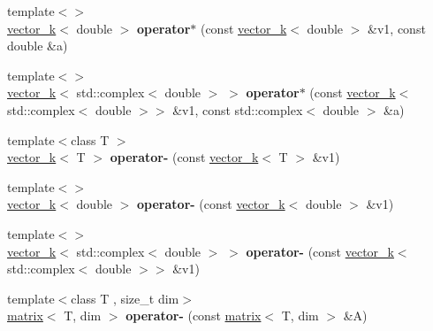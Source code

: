 \begin{DoxyCompactItemize}
\item 
\hypertarget{namespacekeycpp_ad7f693a660597bd39cdca67ea4000a81}{{\footnotesize template$<$$>$ }\\\hyperlink{classkeycpp_1_1vector__k}{vector\-\_\-k}$<$ double $>$ {\bfseries operator$\ast$} (const \hyperlink{classkeycpp_1_1vector__k}{vector\-\_\-k}$<$ double $>$ \&v1, const double \&a)}\label{namespacekeycpp_ad7f693a660597bd39cdca67ea4000a81}

\item 
\hypertarget{namespacekeycpp_ab34753e2fc26c9fab1fcbee6700c691b}{{\footnotesize template$<$$>$ }\\\hyperlink{classkeycpp_1_1vector__k}{vector\-\_\-k}$<$ std\-::complex$<$ double $>$ $>$ {\bfseries operator$\ast$} (const \hyperlink{classkeycpp_1_1vector__k}{vector\-\_\-k}$<$ std\-::complex$<$ double $>$$>$ \&v1, const std\-::complex$<$ double $>$ \&a)}\label{namespacekeycpp_ab34753e2fc26c9fab1fcbee6700c691b}

\item 
\hypertarget{namespacekeycpp_a8afc5fb1383ec8d667f52ac3778df34c}{{\footnotesize template$<$class T $>$ }\\\hyperlink{classkeycpp_1_1vector__k}{vector\-\_\-k}$<$ T $>$ {\bfseries operator-\/} (const \hyperlink{classkeycpp_1_1vector__k}{vector\-\_\-k}$<$ T $>$ \&v1)}\label{namespacekeycpp_a8afc5fb1383ec8d667f52ac3778df34c}

\item 
\hypertarget{namespacekeycpp_a18d99849477754b35d0a3187ceb60508}{{\footnotesize template$<$$>$ }\\\hyperlink{classkeycpp_1_1vector__k}{vector\-\_\-k}$<$ double $>$ {\bfseries operator-\/} (const \hyperlink{classkeycpp_1_1vector__k}{vector\-\_\-k}$<$ double $>$ \&v1)}\label{namespacekeycpp_a18d99849477754b35d0a3187ceb60508}

\item 
\hypertarget{namespacekeycpp_a77245a0566dc6436443ad15187512ef0}{{\footnotesize template$<$$>$ }\\\hyperlink{classkeycpp_1_1vector__k}{vector\-\_\-k}$<$ std\-::complex$<$ double $>$ $>$ {\bfseries operator-\/} (const \hyperlink{classkeycpp_1_1vector__k}{vector\-\_\-k}$<$ std\-::complex$<$ double $>$$>$ \&v1)}\label{namespacekeycpp_a77245a0566dc6436443ad15187512ef0}

\item 
\hypertarget{namespacekeycpp_ac6b0a62473683f833921698fbf6f5ed2}{{\footnotesize template$<$class T , size\-\_\-t dim$>$ }\\\hyperlink{classkeycpp_1_1matrix}{matrix}$<$ T, dim $>$ {\bfseries operator-\/} (const \hyperlink{classkeycpp_1_1matrix}{matrix}$<$ T, dim $>$ \&A)}\label{namespacekeycpp_ac6b0a62473683f833921698fbf6f5ed2}


\end{DoxyCompactItemize}
